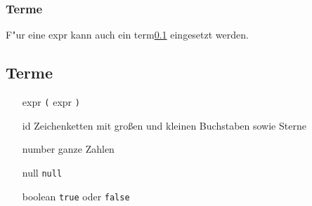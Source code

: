 \documentclass{article}
\begin{document}
\subsubsection{Terme}
F"ur eine expr kann auch ein term{\tiny\ref{term}} eingesetzt werden.

\subsection{Terme} \label{term}
\begin{itemize}
\item[expr]{\texttt{(} expr \texttt{)}}
\item[id]{Zeichenketten mit großen und kleinen Buchstaben sowie Sterne }
\item[number]{ganze Zahlen }
\item[null]{\texttt{null} }
\item[boolean]{\texttt{true} oder \texttt{false} }
\end{itemize}


\newpage
\end{document}
